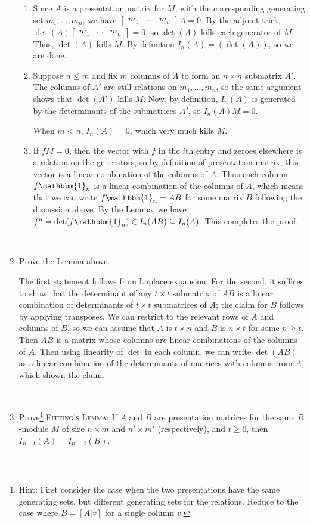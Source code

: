 \documentclass[12pt]{amsart}
\newcommand{\Bold}[1]{\contour{black}{#1}}
\newcommand{\1}{\mathbbm{1}}
\newcommand{\solution}[1]{\ifthenelse {\equal{\displaysol}{1}} {\begin{framed}{\color{meretale}\noindent #1}\end{framed}} { \ }}
\newcommand\itemB{\stepcounter{enumi}\item[(\theenumi)]}
\newcommand\itemC{\stepcounter{enumi}\item[{\it{(\theenumi)}}]}
\newcommand\itema{\stepcounter{enumii}\item[{\Bold{(\theenumii)}}]}
\begin{document}
\begin{enumerate}
\solution{
\begin{enumerate}
\itema Since $A$ is a presentation matrix for $M$, with the corresponding generating set $m_1,\dots,m_n$, we have $\begin{bmatrix} m_1 & \dots & m_n \end{bmatrix} A=0$. By the adjoint trick, $ \det(A) \begin{bmatrix} m_1 & \dots & m_n \end{bmatrix} = 0$, so $\det(A)$ kills each generator of $M$. Thus, $\det(A)$ kills $M$. By definition $I_n(A) = (\det(A))$, so we are done.

\itema Suppose $n\leq m$ and fix $m$ columns of $A$ to form an $n\times n$ submatrix $A'$. The columns of $A'$ are still relations on $m_1,\dots,m_n$, so the same argument shows that $\det(A')$ kills $M$. Now, by definition, $I_n(A)$ is generated by the determinants of the submatrices $A'$, so $I_n(A) M=0$.

When $m<n$, $I_n(A)=0$, which very much kills $M$.


\itema If $fM=0$, then the vector with $f$ in the $i$th entry and zeroes elsewhere is a relation on the generators, so by definition of presentation matrix, this vector is a linear combination of the columns of $A$. Thus each column $f\1_n$ is a linear combination of the columns of $A$, which means that we can write $f\1_n= AB$ for some matrix $B$ following the discussion above. By the Lemma, we have $f^n = \det(f \1_n) \in I_n(AB) \subseteq I_n(A)$. This completes the proof.
\end{enumerate}
}




\itemB Prove the Lemma above.

\solution{The first statement follows from Laplace expansion. For the second, it suffices to show that the determinant of any $t\times t$ submatrix of $AB$ is a linear combination of determinants of $t\times t$ submatrices of $A$; the claim for $B$ follows by applying transposes. We can restrict to the relevant rows of $A$ and columns of $B$, so we can assume that $A$ is $t\times n$ and $B$ is $n \times t$ for some $n\geq t$. Then $AB$ is a matrix whose columns are linear combinations of the columns of $A$. Then using linearity of $\det$ in each column, we can write $\det(AB)$ as a linear combination of the determinants of matrices with columns from $A$, which shown the claim.}


\itemC Prove\footnote{Hint: First consider the case when the two presentations have the same generating sets, but different generating sets for the relations. Reduce to the case where $B = [ A | v]$ for a single column $v$.} \textsc{Fitting's Lemma:}  If $A$ and $B$ are presentation matrices for the same $R$-module $M$ of size $n\times m$ and $n' \times m'$ (respectively), and $t\geq 0$, then $I_{n-t}(A) = I_{n'-t}(B)$.

\solution{}



\end{enumerate}


\vfill
\end{document}
